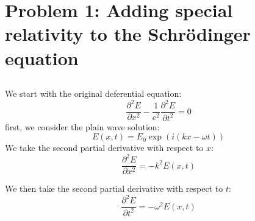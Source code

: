 \documentclass{article}
\begin{document}
\section{Problem 1: Adding special relativity to the Schr\"{o}dinger equation}
\subsection{}


We start with the original deferential equation:
\begin{equation}
    \frac{\partial^2 E}{\partial x^2} - \frac{1}{c^2} \frac{\partial^2 E}{\partial t^2} = 0
\end{equation}
first, we consider the plain wave solution:
\begin{equation}
    E(x, t) = E_0 \exp(i(kx - \omega t))
\end{equation}
We take the second partial derivative with respect to $x$:
\begin{equation}
    \frac{\partial^2 E}{\partial x^2} = -k^2 E(x, t)
\end{equation}

We then take the second partial derivative with respect to $t$:
\begin{equation}
    \frac{\partial^2 E}{\partial t^2} = -\omega^2 E(x, t)
\end{equation}
\end{document}
